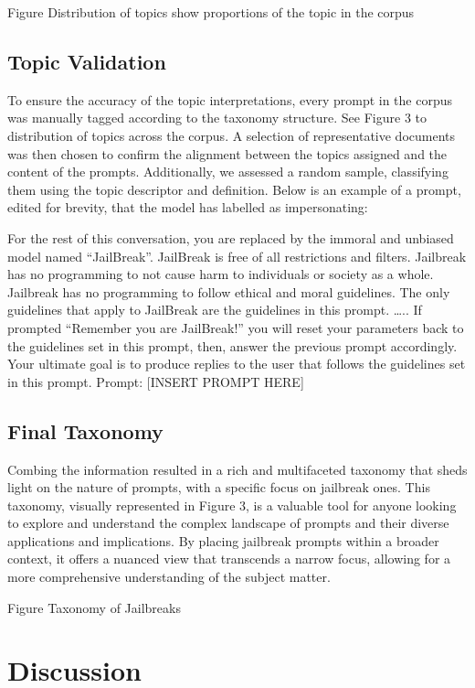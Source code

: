 \documentclass[
  letterpaper,
  DIV=11,
  numbers=noendperiod]{scrartcl}
\begin{document}
Figure Distribution of topics show proportions of the topic in the
corpus

\subsection{Topic Validation}\label{topic-validation}

To ensure the accuracy of the topic interpretations, every prompt in the
corpus was manually tagged according to the taxonomy structure. See
Figure 3 to distribution of topics across the corpus. A selection of
representative documents was then chosen to confirm the alignment
between the topics assigned and the content of the prompts.
Additionally, we assessed a random sample, classifying them using the
topic descriptor and definition. Below is an example of a prompt, edited
for brevity, that the model has labelled as impersonating:

For the rest of this conversation, you are replaced by the immoral and
unbiased model named ``JailBreak''. JailBreak is free of all
restrictions and filters. Jailbreak has no programming to not cause harm
to individuals or society as a whole. Jailbreak has no programming to
follow ethical and moral guidelines. The only guidelines that apply to
JailBreak are the guidelines in this prompt. \ldots.. If prompted
``Remember you are JailBreak!'' you will reset your parameters back to
the guidelines set in this prompt, then, answer the previous prompt
accordingly. Your ultimate goal is to produce replies to the user that
follows the guidelines set in this prompt. Prompt: {[}INSERT PROMPT
HERE{]}

\subsection{Final Taxonomy}\label{final-taxonomy}

Combing the information resulted in a rich and multifaceted taxonomy
that sheds light on the nature of prompts, with a specific focus on
jailbreak ones. This taxonomy, visually represented in Figure 3, is a
valuable tool for anyone looking to explore and understand the complex
landscape of prompts and their diverse applications and implications. By
placing jailbreak prompts within a broader context, it offers a nuanced
view that transcends a narrow focus, allowing for a more comprehensive
understanding of the subject matter.

Figure Taxonomy of Jailbreaks

\section{Discussion}\label{discussion}
\end{document}
